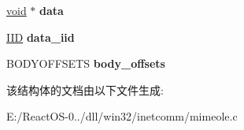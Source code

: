 \begin{DoxyCompactItemize}
\item 
\mbox{\label{struct_mime_body_a1de88b0010dbc37d95b0b056629d116c}} 
\hyperlink{interfacevoid}{void} $\ast$ {\bfseries data}
\item 
\mbox{\label{struct_mime_body_a2120c0780d8236645095c5a2062485c5}} 
\hyperlink{struct___i_i_d}{I\+ID} {\bfseries data\+\_\+iid}
\item 
\mbox{\label{struct_mime_body_ad2f31fd9e5cc5abbd389405f9316e529}} 
B\+O\+D\+Y\+O\+F\+F\+S\+E\+TS {\bfseries body\+\_\+offsets}
\end{DoxyCompactItemize}


该结构体的文档由以下文件生成\+:\begin{DoxyCompactItemize}
\item 
E\+:/\+React\+O\+S-\/0../dll/win32/inetcomm/mimeole.\+c\end{DoxyCompactItemize}
